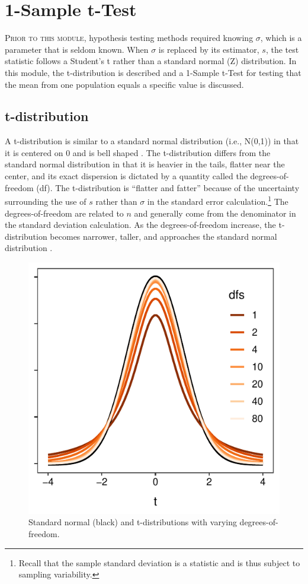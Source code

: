\documentclass[10pt,openany]{book}\usepackage[]{graphicx}\usepackage[]{color}
\newenvironment{knitrout}{}{} %
\begin{document}
\chapter{1-Sample t-Test} \label{chap:tTest1}

\minitoc
\vspace*{48pt}

\lettrine{P}{rior to this module}, hypothesis testing methods required knowing $\sigma$, which is a parameter that is seldom known. When $\sigma$ is replaced by its estimator, $s$, the test statistic follows a Student's t rather than a standard normal (Z) distribution. In this module, the t-distribution is described and a 1-Sample t-Test for testing that the mean from one population equals a specific value is discussed.

\vspace*{12pt}
\section{t-distribution}\label{sect:tDist}
A t-distribution is similar to a standard normal distribution (i.e., N(0,1)) in that it is centered on 0 and is bell shaped . The t-distribution differs from the standard normal distribution in that it is heavier in the tails, flatter near the center, and its exact dispersion is dictated by a quantity called the degrees-of-freedom (df). The t-distribution is ``flatter and fatter'' because of the uncertainty surrounding the use of $s$ rather than $\sigma$ in the standard error calculation.\footnote{Recall that the sample standard deviation is a statistic and is thus subject to sampling variability.} The degrees-of-freedom are related to $n$ and generally come from the denominator in the standard deviation calculation. As the degrees-of-freedom increase, the t-distribution becomes narrower, taller, and approaches the standard normal distribution .

\begin{knitrout}
\color{fgcolor}\begin{figure}[hbtp]

{\centering \includegraphics[width=.4\linewidth]{Figs/tvsZ-1} 

}

\caption[Standard normal (black) and t-distributions with varying degrees-of-freedom]{Standard normal (black) and t-distributions with varying degrees-of-freedom.}\label{fig:tvsZ}
\end{figure}


\end{knitrout}
\end{document}
